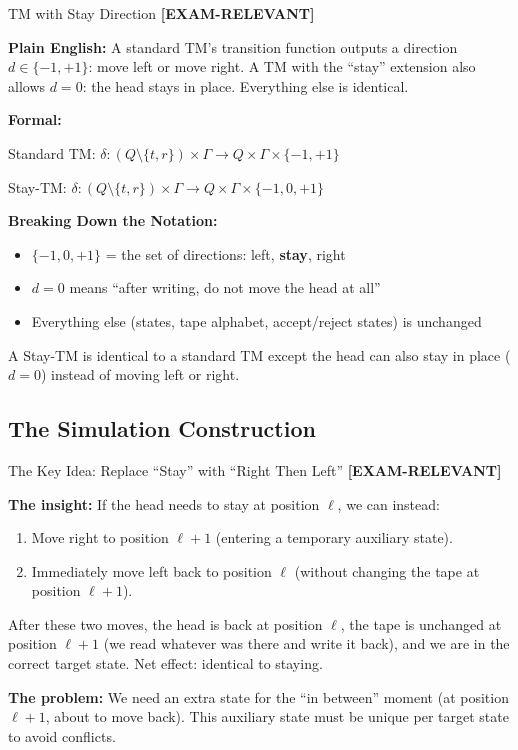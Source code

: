 \documentclass[11pt,a4paper]{article}
\newcommand{\kemark}{\textcolor{red!70!black}{\textbf{[EXAM-RELEVANT]}}}
\newcommand{\kt}[1]{\par\vspace{0.3em}\colorbox{yellow!60}{\parbox{\dimexpr\linewidth-2\fboxsep}{#1}}\vspace{0.3em}}
\begin{document}
\begin{definitionbox}{TM with Stay Direction \kemark}

\textbf{Plain English:}
A standard TM's transition function outputs a direction $d \in \{-1, +1\}$: move left or move right. A TM with the ``stay'' extension also allows $d = 0$: the head stays in place. Everything else is identical.

\textbf{Formal:}

Standard TM: $\delta: (Q \setminus \{t,r\}) \times \Gamma \to Q \times \Gamma \times \{-1, +1\}$

Stay-TM: $\delta: (Q \setminus \{t,r\}) \times \Gamma \to Q \times \Gamma \times \{-1, 0, +1\}$

\textbf{Breaking Down the Notation:}
\begin{itemize}[nosep]
\item $\{-1, 0, +1\}$ = the set of directions: left, \textbf{stay}, right
\item $d = 0$ means ``after writing, do not move the head at all''
\item Everything else (states, tape alphabet, accept/reject states) is unchanged
\end{itemize}

\kt{A Stay-TM is identical to a standard TM except the head can also stay in place ($d = 0$) instead of moving left or right.}
\end{definitionbox}

\subsection{The Simulation Construction}

\begin{conceptbox}{The Key Idea: Replace ``Stay'' with ``Right Then Left'' \kemark}

\textbf{The insight:} If the head needs to stay at position $\ell$, we can instead:
\begin{enumerate}[nosep]
\item Move right to position $\ell + 1$ (entering a temporary auxiliary state).
\item Immediately move left back to position $\ell$ (without changing the tape at position $\ell + 1$).
\end{enumerate}

After these two moves, the head is back at position $\ell$, the tape is unchanged at position $\ell + 1$ (we read whatever was there and write it back), and we are in the correct target state. Net effect: identical to staying.

\textbf{The problem:} We need an extra state for the ``in between'' moment (at position $\ell+1$, about to move back). This auxiliary state must be unique per target state to avoid conflicts.
\end{conceptbox}
\end{document}
